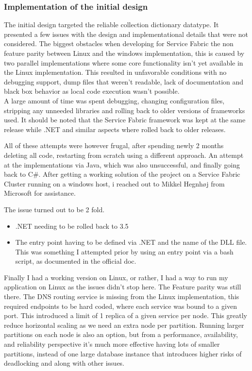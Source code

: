 \documentclass[a4paper,10pt,titlepage]{report}
\begin{document}
  

\subsubsection{Implementation of the initial design}

The initial design targeted the reliable collection dictionary datatype. It presented a few issues with the design and implementational details that were not considered. The biggest obstacles when developing for Service Fabric the non feature parity between Linux and the windows implementation, this is caused by two parallel implementations where some core functionality isn't yet available in the Linux implementation. This resulted in unfavorable conditions with no debugging support, dump files that weren't readable, lack of documentation and black box behavior as local code execution wasn't possible. \\ \vspace{5mm}
A large amount of time was spent debugging, changing configuration files, stripping any unneeded libraries and rolling back to older versions of frameworks used. It should be noted that the Service Fabric framework was kept at the same release while .NET and similar aspects where rolled back to older releases.

All of these attempts were however frugal, after spending newly 2 months deleting all code, restarting from scratch using a different approach. An attempt at the implementations via Java, which was also unsuccessful, and finally going back to C\#. After getting a working solution of the project on a Service Fabric Cluster running on a windows host, i reached out to Mikkel Hegnhøj from Microsoft for assistance.

The issue turned out to be 2 fold.
\begin{itemize}
    \item .NET needing to be rolled back to 3.5
    \item The entry point having to be defined via .NET and the name of the DLL file. This was something I attempted prior by using an entry point via a bash script, as documented in the official doc. 
\end{itemize}

Finally I had a working version on Linux, or rather, I had a way to run my application on Linux as the issues didn't stop here. The Feature parity was still there. The DNS routing service is missing from the Linux implementation, this required endpoints to be hard coded, where each service was bound to a given port. This introduced a limit of 1 replica of a given service per node. This greatly reduce horizontal scaling as we need an extra node per partition. Running larger partitions on each node is also an option, but from a performance, availability, and reliability perspective it's much more effective having lots of smaller partitions, instead of one large database instance that introduces higher risks of deadlocking and along with other issues.
\end{document}

